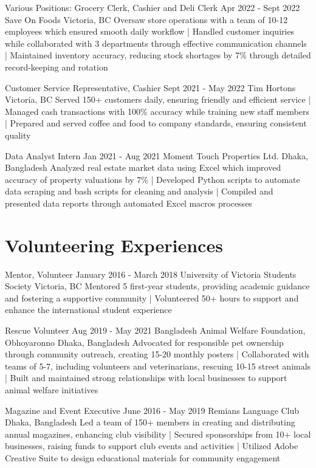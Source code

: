 \documentclass[a4paper,10pt]{article}
\begin{document}
\relevantexperience
{Various Positions: Grocery Clerk, Cashier and Deli Clerk}
{Apr 2022 - Sept 2022}
{Save On Foods}
{Victoria, BC}
{Oversaw store operations with a team of 10-12 employees which ensured smooth daily workflow 
| Handled customer inquiries while collaborated with 3 departments through effective communication channels 
| Maintained inventory accuracy, reducing stock shortages by 7\% through detailed record-keeping and rotation
}

\relevantexperience
{Customer Service Representative, Cashier}
{Sept 2021 - May 2022}
{Tim Hortons}
{Victoria, BC}
{Served 150+ customers daily, ensuring friendly and efficient service 
| Managed cash transactions with 100\% accuracy while training new staff members 
| Prepared and served coffee and food to company standards, ensuring consistent quality
}

\relevantexperience
{Data Analyst Intern}
{Jan 2021 - Aug 2021}
{Moment Touch Properties Ltd.}
{Dhaka, Bangladesh}
{Analyzed real estate market data using Excel which improved accuracy of property valuations by 7\% 
| Developed Python scripts to automate data scraping and bash scripts for cleaning and analysis
| Compiled and presented data reports through automated Excel macros processes
}

\section{Volunteering Experiences}

\relevantexperience
{Mentor, Volunteer}
{January 2016 - March 2018}
{University of Victoria Students Society}
{Victoria, BC}
{Mentored 5 first-year students, providing academic guidance and fostering a supportive community
| Volunteered 50+ hours to support and enhance the international student experience 
}

\relevantexperience
{Rescue Volunteer}
{Aug 2019 - May 2021}
{Bangladesh Animal Welfare Foundation, Obhoyaronno}
{Dhaka, Bangladesh}
{Advocated for responsible pet ownership through community outreach, creating 15-20 monthly posters 
| Collaborated with teams of 5-7, including volunteers and veterinarians, rescuing 10-15 street animals 
| Built and maintained strong relationships with local businesses to support animal welfare initiatives
}

\relevantexperience
{Magazine and Event Executive}
{June 2016 - May 2019}
{Remians Language Club}
{Dhaka, Bangladesh}
{Led a team of 150+ members in creating and distributing annual magazines, enhancing club visibility
| Secured sponsorships from 10+ local businesses, raising funds to support club events and activities 
| Utilized Adobe Creative Suite to design educational materials for community engagement
}
\end{document}
